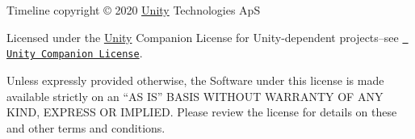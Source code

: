 Timeline copyright © 2020 \mbox{\hyperlink{namespace_unity}{Unity}} Technologies ApS

Licensed under the \mbox{\hyperlink{namespace_unity}{Unity}} Companion License for Unity-\/dependent projects--see \href{http://www.unity3d.com/legal/licenses/Unity_Companion_License}{\texttt{ Unity Companion License}}.

Unless expressly provided otherwise, the Software under this license is made available strictly on an “\+AS I\+S” B\+A\+S\+IS W\+I\+T\+H\+O\+UT W\+A\+R\+R\+A\+N\+TY OF A\+NY K\+I\+ND, E\+X\+P\+R\+E\+SS OR I\+M\+P\+L\+I\+ED. Please review the license for details on these and other terms and conditions. 